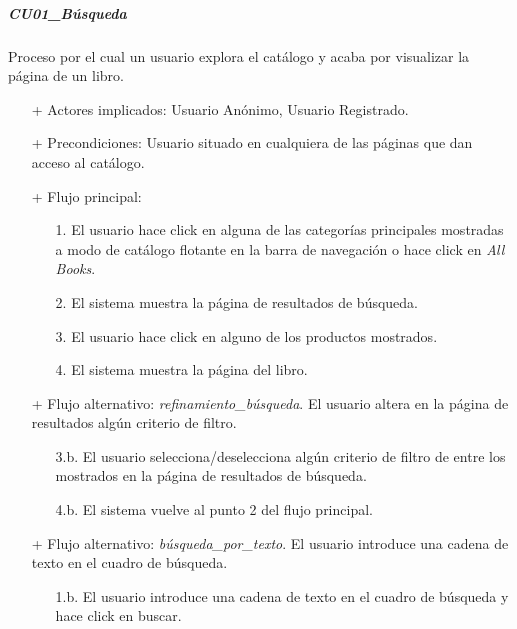 \documentclass[a4paper]{article}
\begin{document}
            \subparagraph{CU01\_Búsqueda}
            Proceso por el cual un usuario explora el catálogo y acaba por visualizar la página de un libro.
            \begin{itemize}
                \item[+] Actores implicados: Usuario Anónimo, Usuario Registrado.
                \item[+] Precondiciones: Usuario situado en cualquiera de las páginas que dan acceso al catálogo.
                \item[+] Flujo principal:
                \begin{enumerate}
                    \item[1.] El usuario hace click en alguna de las categorías principales mostradas a modo de catálogo flotante en la barra de navegación
                    o hace click en \emph{All Books}.
                    \item[2.] El sistema muestra la página de resultados de búsqueda.
                    \item[3.] El usuario hace click en alguno de los productos mostrados.
                    \item[4.] El sistema muestra la página del libro.
                \end{enumerate}
                \item[+] Flujo alternativo: \emph{refinamiento\_búsqueda}. El usuario altera en la página de resultados algún criterio de filtro.
                \begin{itemize}
                    \item[3.b.] El usuario selecciona/deselecciona algún criterio de filtro de entre los mostrados en la página de resultados de búsqueda.
                    \item[4.b.] El sistema vuelve al punto 2 del flujo principal.
                \end{itemize}
                \item[+] Flujo alternativo: \emph{búsqueda\_por\_texto}. El usuario introduce una cadena de texto en el cuadro de búsqueda.
                \begin{itemize}
                    \item[1.b.] El usuario introduce una cadena de texto en el cuadro de búsqueda y hace click en buscar.
                \end{itemize}
            \end{itemize}
\end{document}
